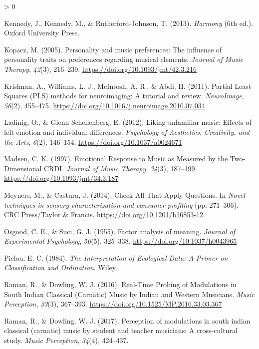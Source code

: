 \documentclass[
  english,
  man,floatsintext]{apa6}
\newlength{\cslhangindent}
\newenvironment{CSLReferences}[2] %
 {%
  \setlength{\parindent}{0pt}
  \ifodd #1 \everypar{\setlength{\hangindent}{\cslhangindent}}\ignorespaces\fi
  \ifnum #2 > 0
  \setlength{\parskip}{#2\baselineskip}
  \fi
 }%
 {}
\begin{document}
\begin{CSLReferences}{1}{0}
\leavevmode\hypertarget{ref-Kennedy2013}{}%
Kennedy, J., Kennedy, M., \& Rutherford-Johnson, T. (2013). \emph{Harmony} (6th ed.). Oxford University Press.

\leavevmode\hypertarget{ref-Kopacz2005}{}%
Kopacz, M. (2005). {Personality and music preferences: The influence of personality traits on preferences regarding musical elements}. \emph{Journal of Music Therapy}, \emph{42}(3), 216--239. \url{https://doi.org/10.1093/jmt/42.3.216}

\leavevmode\hypertarget{ref-Krishnan2011}{}%
Krishnan, A., Williams, L. J., McIntosh, A. R., \& Abdi, H. (2011). {Partial Least Squares (PLS) methods for neuroimaging: A tutorial and review}. \emph{NeuroImage}, \emph{56}(2), 455--475. \url{https://doi.org/10.1016/j.neuroimage.2010.07.034}

\leavevmode\hypertarget{ref-Ladinig2012}{}%
Ladinig, O., \& Glenn Schellenberg, E. (2012). {Liking unfamiliar music: Effects of felt emotion and individual differences}. \emph{Psychology of Aesthetics, Creativity, and the Arts}, \emph{6}(2), 146--154. \url{https://doi.org/10.1037/a0024671}

\leavevmode\hypertarget{ref-Madsen1997}{}%
Madsen, C. K. (1997). {Emotional Response to Music as Measured by the Two-Dimensional CRDI}. \emph{Journal of Music Therapy}, \emph{34}(3), 187--199. \url{https://doi.org/10.1093/jmt/34.3.187}

\leavevmode\hypertarget{ref-Meyners2014}{}%
Meyners, M., \& Castura, J. (2014). {Check-All-That-Apply Questions}. In \emph{Novel techniques in sensory characterization and consumer profiling} (pp. 271--306). CRC Press/Taylor {\&} Francis. \url{https://doi.org/10.1201/b16853-12}

\leavevmode\hypertarget{ref-Osgood1955}{}%
Osgood, C. E., \& Suci, G. J. (1955). {Factor analysis of meaning}. \emph{Journal of Experimental Psychology}, \emph{50}(5), 325--338. \url{https://doi.org/10.1037/h0043965}

\leavevmode\hypertarget{ref-Pielou1984}{}%
Pielou, E. C. (1984). \emph{{The Interpretation of Ecological Data: A Primer on Classification and Ordination}}. Wiley.

\leavevmode\hypertarget{ref-Raman2016}{}%
Raman, R., \& Dowling, W. J. (2016). {Real-Time Probing of Modulations in South Indian Classical (Carnātic) Music by Indian and Western Musicians}. \emph{Music Perception}, \emph{33}(3), 367--393. \url{https://doi.org/10.1525/MP.2016.33.03.367}

\leavevmode\hypertarget{ref-Raman2017}{}%
Raman, R., \& Dowling, W. J. (2017). {Perception of modulations in south indian classical (carnatic) music by student and teacher musicians: A cross-cultural study}. \emph{Music Perception}, \emph{34}(4), 424--437.


\end{CSLReferences}
\end{document}
